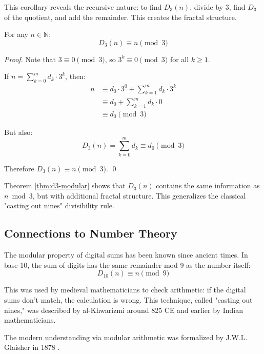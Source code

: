 This corollary reveals the recursive nature: to find $D_3(n)$, divide by 3, find $D_3$ of the quotient, and add the remainder. This creates the fractal structure.

\begin{theorem}
\label{thm:d3-modular}
For any $n \in \mathbb{N}$:
$$D_3(n) \equiv n \pmod{3}$$
\end{theorem}

\begin{proof}
Note that $3 \equiv 0 \pmod{3}$, so $3^k \equiv 0 \pmod{3}$ for all $k \geq 1$.

If $n = \sum_{k=0}^{m} d_k \cdot 3^k$, then:
\begin{align}
n &\equiv d_0 \cdot 3^0 + \sum_{k=1}^{m} d_k \cdot 3^k \\
&\equiv d_0 + \sum_{k=1}^{m} d_k \cdot 0 \\
&\equiv d_0 \pmod{3}
\end{align}

But also:
$$D_3(n) = \sum_{k=0}^{m} d_k \equiv d_0 \pmod{3}$$

Therefore $D_3(n) \equiv n \pmod{3}$. \qed
\end{proof}

\begin{remark}
Theorem \ref{thm:d3-modular} shows that $D_3(n)$ contains the same information as $n \bmod 3$, but with additional fractal structure. This generalizes the classical "casting out nines" divisibility rule.
\end{remark}


\subsection{Connections to Number Theory}
\label{subsec:connections-number-theory}

\begin{historicalnote}
The modular property of digital sums has been known since ancient times. In base-10, the sum of digits has the same remainder mod 9 as the number itself:
$$D_{10}(n) \equiv n \pmod{9}$$

This was used by medieval mathematicians to check arithmetic: if the digital sums don't match, the calculation is wrong. This technique, called "casting out nines," was described by al-Khwarizmi around 825 CE and earlier by Indian mathematicians.

The modern understanding via modular arithmetic was formalized by J.W.L. Glaisher in 1878 \cite{glaisher1878}.
\end{historicalnote}

